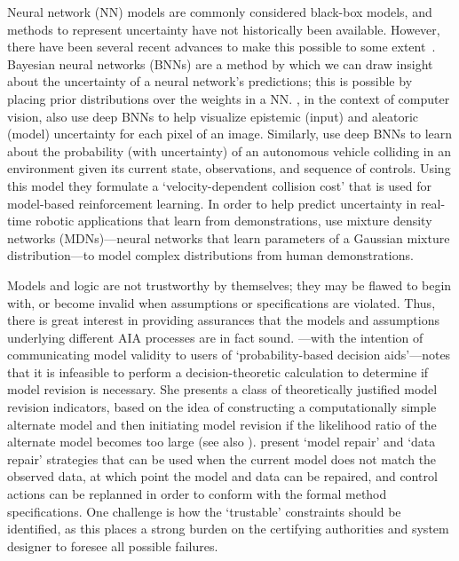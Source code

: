 Neural network (NN) models are commonly considered black-box models, and methods to represent uncertainty have not historically been available. However, there have been several recent advances to make this possible to some extent~\cite{Gal2016-om,Gal2016-eq}. Bayesian neural networks (BNNs) are a method by which we can draw insight about the uncertainty of a neural network's predictions; this is possible by placing prior distributions over the weights in a NN. \citet{Kendall2017-ry}, in the context of computer vision, also use deep BNNs to help visualize epistemic (input) and aleatoric (model) uncertainty for each pixel of an image. 
Similarly, \citet{Kahn2017-vy} use deep BNNs to learn about the probability (with uncertainty) of an autonomous vehicle colliding in an environment given its current state, observations, and sequence of controls. Using this model they formulate a `velocity-dependent collision cost' that is used for model-based reinforcement learning. 
In order to help predict uncertainty in real-time robotic applications that learn from demonstrations, \citet{Choi2017-th} use mixture density networks (MDNs)---neural networks that learn parameters of a Gaussian mixture distribution---to model complex distributions from human demonstrations.

Models and logic are not trustworthy by themselves; they may be flawed to begin with, or become invalid when assumptions or specifications are violated. Thus, there is great interest in providing assurances that the models and assumptions underlying different AIA processes are in fact sound. \citet{Laskey1991-mf}---with the intention of communicating model validity to users of `probability-based decision aids'---notes that it is infeasible to perform a decision-theoretic calculation to determine if model revision is necessary. She presents a class of theoretically justified model revision indicators, based on the idea of constructing a computationally simple alternate model and then initiating model revision if the likelihood ratio of the alternate model becomes too large (see also \citet{Zagorecki2015-qy,Habbema1976-xd}). \citet{Ghosh2016-dl}  present `model repair' and `data repair' strategies that can be used when the current model does not match the observed data, at which point the model and data can be repaired, and control actions can be replanned in order to conform with the formal method specifications. One challenge is how the `trustable' constraints should be identified, as this places a strong burden on the certifying authorities and system designer to foresee all possible failures.
